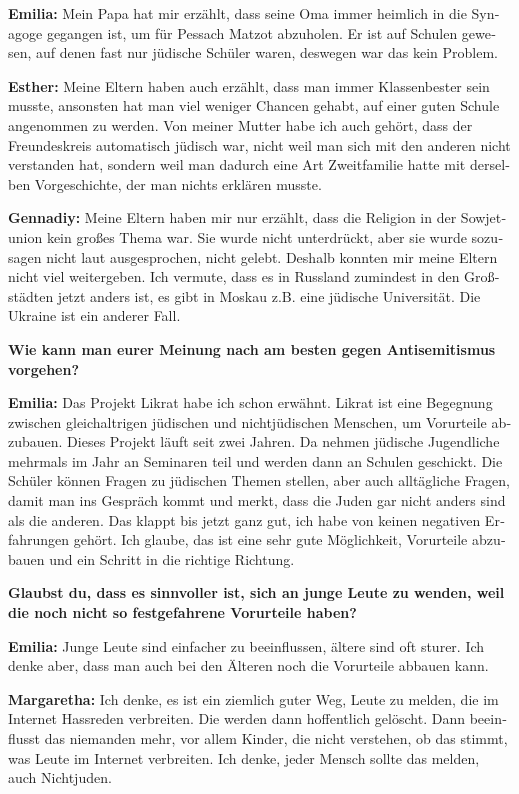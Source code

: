 \begin{otherlanguage}{ngerman}
\textbf{Emilia:} Mein Papa hat mir erzählt, dass seine Oma immer heimlich in die Synagoge gegangen ist, um für Pessach Matzot abzuholen. Er ist auf Schulen gewesen, auf denen fast nur jüdische Schüler waren, deswegen war das kein Problem.  

\textbf{Esther:} Meine Eltern haben auch erzählt, dass man immer Klassenbester sein musste, ansonsten hat man viel weniger Chancen gehabt, auf einer guten Schule angenommen zu werden. Von meiner Mutter habe ich auch gehört, dass der Freundeskreis automatisch jüdisch war, nicht weil man sich mit den anderen nicht verstanden hat, sondern weil man dadurch eine Art Zweitfamilie hatte mit derselben Vorgeschichte, der man nichts erklären musste. 

\textbf{Gennadiy:} Meine Eltern haben mir nur erzählt, dass die Religion in der Sowjetunion kein großes Thema war. Sie wurde nicht unterdrückt, aber sie wurde sozusagen nicht laut ausgesprochen, nicht gelebt. Deshalb konnten mir meine Eltern nicht viel weitergeben. Ich vermute, dass es in Russland zumindest in den Großstädten jetzt anders ist, es gibt in Moskau z.B. eine jüdische Universität. Die Ukraine ist ein anderer Fall.  

\textbf{Wie kann man eurer Meinung nach am besten gegen Antisemitismus vorgehen?} 

\textbf{Emilia:} Das Projekt Likrat habe ich schon erwähnt. Likrat ist eine Begegnung zwischen gleichaltrigen jüdischen und nichtjüdischen Menschen, um Vorurteile abzubauen. Dieses Projekt läuft seit zwei Jahren. Da nehmen jüdische Jugendliche mehrmals im Jahr an Seminaren teil und werden dann an Schulen geschickt. Die Schüler können Fragen zu jüdischen Themen stellen, aber auch alltägliche Fragen, damit man ins Gespräch kommt und merkt, dass die Juden gar nicht anders sind als die anderen. Das klappt bis jetzt ganz gut, ich habe von keinen negativen Erfahrungen gehört. Ich glaube, das ist eine sehr gute Möglichkeit, Vorurteile abzubauen und ein Schritt in die richtige Richtung.                                                                                              

\textbf{Glaubst du, dass es sinnvoller ist, sich an junge Leute zu wenden, weil die noch nicht so festgefahrene Vorurteile haben?} 

\textbf{Emilia:} Junge Leute sind einfacher zu beeinflussen, ältere sind oft sturer. Ich denke aber, dass man auch bei den Älteren noch die Vorurteile abbauen kann.  

\textbf{Margaretha:} Ich denke, es ist ein ziemlich guter Weg, Leute zu melden, die im Internet Hassreden verbreiten. Die werden dann hoffentlich gelöscht. Dann beeinflusst das niemanden mehr, vor allem Kinder, die nicht verstehen, ob das stimmt, was Leute im Internet verbreiten. Ich denke, jeder Mensch sollte das melden, auch Nichtjuden. 


\end{otherlanguage}
